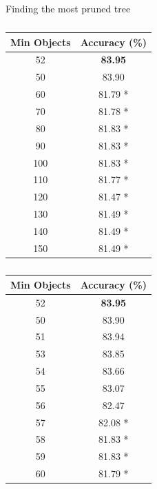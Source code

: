\documentclass[12pt]{article}
\begin{document}
      \begin{table}[H]
        \caption{Finding the most pruned tree}
        \begin{subtable}{.5\linewidth}
          \centering
          \caption{}
          \begin{tabular}{c|c}
            \toprule
            \multicolumn{1}{l|}{Min Objects} & \multicolumn{1}{l}{Accuracy (\%)} \\
            \midrule
            52    & \textbf{83.95} \\
            \midrule
            50    & 83.90 \\
            60    & 81.79 * \\
            70    & 81.78 * \\
            80    & 81.83 * \\
            90    & 81.83 * \\
            100   & 81.83 * \\
            110   & 81.77 * \\
            120   & 81.47 * \\
            130   & 81.49 * \\
            140   & 81.49 * \\
            150   & 81.49 * \\
            \bottomrule
          \end{tabular}
        \label{tab:dt-minobj-prun-a}
        \end{subtable}
        \begin{subtable}{.5\linewidth}
          \centering
          \caption{}
          \begin{tabular}{c|c}
            \toprule
            \multicolumn{1}{l|}{Min Objects} & \multicolumn{1}{l}{Accuracy (\%)} \\
            \midrule
            52    & \textbf{83.95} \\
            \midrule
            50    & 83.90 \\
            51    & 83.94 \\
            53    & 83.85 \\
            54    & 83.66 \\
            55    & 83.07 \\
            56    & 82.47 \\
            57    & 82.08 * \\
            58    & 81.83 * \\
            59    & 81.83 * \\
            60    & 81.79 * \\
            \bottomrule
          \end{tabular}
          \label{tab:dt-minobj-prun-b}
        \end{subtable}
        \label{tab:dt-minobj-prun}
      \end{table}
\end{document}
